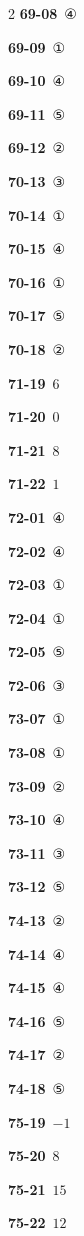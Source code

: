 \documentclass[10pt,a4paper]{article}
\begin{document}
\begin{multicols}{2}
\noindent\textbf{69-08}\ ④\par
\noindent\textbf{69-09}\ ①\par
\noindent\textbf{69-10}\ ④\par
\noindent\textbf{69-11}\ ⑤\par
\noindent\textbf{69-12}\ ②\par
\noindent\textbf{70-13}\ ③\par
\noindent\textbf{70-14}\ ①\par
\noindent\textbf{70-15}\ ④\par
\noindent\textbf{70-16}\ ①\par
\noindent\textbf{70-17}\ ⑤\par
\noindent\textbf{70-18}\ ②\par
\noindent\textbf{71-19}\ $6$\par
\noindent\textbf{71-20}\ $0$\par
\noindent\textbf{71-21}\ $8$\par
\noindent\textbf{71-22}\ $1$\par
\noindent\textbf{72-01}\ ④\par
\noindent\textbf{72-02}\ ④\par
\noindent\textbf{72-03}\ ①\par
\noindent\textbf{72-04}\ ①\par
\noindent\textbf{72-05}\ ⑤\par
\noindent\textbf{72-06}\ ③\par
\noindent\textbf{73-07}\ ①\par
\noindent\textbf{73-08}\ ①\par
\noindent\textbf{73-09}\ ②\par
\noindent\textbf{73-10}\ ④\par
\noindent\textbf{73-11}\ ③\par
\noindent\textbf{73-12}\ ⑤\par
\noindent\textbf{74-13}\ ②\par
\noindent\textbf{74-14}\ ④\par
\noindent\textbf{74-15}\ ④\par
\noindent\textbf{74-16}\ ⑤\par
\noindent\textbf{74-17}\ ②\par
\noindent\textbf{74-18}\ ⑤\par
\noindent\textbf{75-19}\ $-1$\par
\noindent\textbf{75-20}\ $8$\par
\noindent\textbf{75-21}\ $15$\par
\noindent\textbf{75-22}\ $12$\par

\end{multicols}
\end{document}
